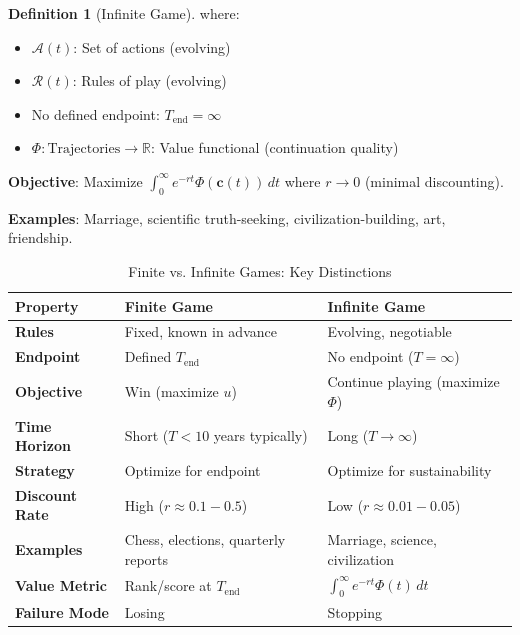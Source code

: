 \documentclass[11pt,a4paper]{article}
\theoremstyle{definition}
\newtheorem{definition}{Definition}[section]
\theoremstyle{remark}
\newcommand{\RR}{\mathbb{R}}
\newcommand{\cc}{\mathbf{c}}
\begin{document}
\begin{small}
\begin{enumerate}
\begin{definition}[Infinite Game]
where:
\begin{itemize}
    \item \(\mathcal{A}(t)\): Set of actions (evolving)
    \item \(\mathcal{R}(t)\): Rules of play (evolving)
    \item No defined endpoint: \(T_{\text{end}} = \infty\)
    \item \(\Phi: \text{Trajectories} \to \RR\): Value functional (continuation quality)
\end{itemize}

\textbf{Objective}: Maximize \(\int_0^\infty e^{-rt} \Phi(\cc(t)) \, dt\) where \(r \to 0\) (minimal discounting).

\textbf{Examples}: Marriage, scientific truth-seeking, civilization-building, art, friendship.
\end{definition}

\begin{table}[H]
\centering
\caption{Finite vs. Infinite Games: Key Distinctions}
\label{tab:games_comparison}
\begin{tabular}{|p{3cm}|p{5.5cm}|p{5.5cm}|}
\hline
\textbf{Property} & \textbf{Finite Game} & \textbf{Infinite Game} \\
\hline
\textbf{Rules} & Fixed, known in advance & Evolving, negotiable \\
\hline
\textbf{Endpoint} & Defined \(T_{\text{end}}\) & No endpoint (\(T = \infty\)) \\
\hline
\textbf{Objective} & Win (maximize \(u\)) & Continue playing (maximize \(\Phi\)) \\
\hline
\textbf{Time Horizon} & Short (\(T < 10\) years typically) & Long (\(T \to \infty\)) \\
\hline
\textbf{Strategy} & Optimize for endpoint & Optimize for sustainability \\
\hline
\textbf{Discount Rate} & High (\(r \approx 0.1-0.5\)) & Low (\(r \approx 0.01-0.05\)) \\
\hline
\textbf{Examples} & Chess, elections, quarterly reports & Marriage, science, civilization \\
\hline
\textbf{Value Metric} & Rank/score at \(T_{\text{end}}\) & \(\int_0^\infty e^{-rt} \Phi(t) \, dt\) \\
\hline
\textbf{Failure Mode} & Losing & Stopping \\
\hline
\end{tabular}
\end{table}


\end{enumerate}
\end{small}
\end{document}

